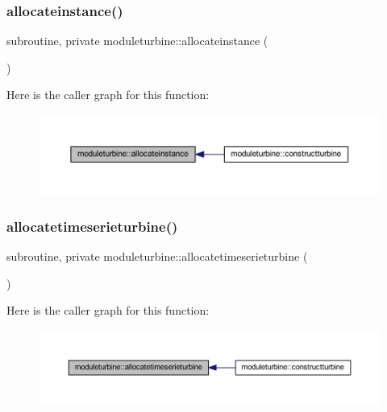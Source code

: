 \subsubsection{\texorpdfstring{allocateinstance()}{allocateinstance()}}
{\footnotesize\ttfamily subroutine, private moduleturbine\+::allocateinstance (\begin{DoxyParamCaption}{ }\end{DoxyParamCaption})\hspace{0.3cm}{\ttfamily [private]}}

Here is the caller graph for this function\+:\nopagebreak
\begin{figure}[H]
\begin{center}
\leavevmode
\includegraphics[width=350pt]{namespacemoduleturbine_ae9c4617b28df25e1f4b06eb1ae1051e4_icgraph}
\end{center}
\end{figure}
\mbox{\label{namespacemoduleturbine_aed8d3d353e62537ef1a5c8225de8339a}} 
\subsubsection{\texorpdfstring{allocatetimeserieturbine()}{allocatetimeserieturbine()}}
{\footnotesize\ttfamily subroutine, private moduleturbine\+::allocatetimeserieturbine (\begin{DoxyParamCaption}{ }\end{DoxyParamCaption})\hspace{0.3cm}{\ttfamily [private]}}

Here is the caller graph for this function\+:\nopagebreak
\begin{figure}[H]
\begin{center}
\leavevmode
\includegraphics[width=350pt]{namespacemoduleturbine_aed8d3d353e62537ef1a5c8225de8339a_icgraph}
\end{center}
\end{figure}
\mbox{\label{namespacemoduleturbine_a256dbbfda7b4fd109ab1088e055e3bd0}} 
